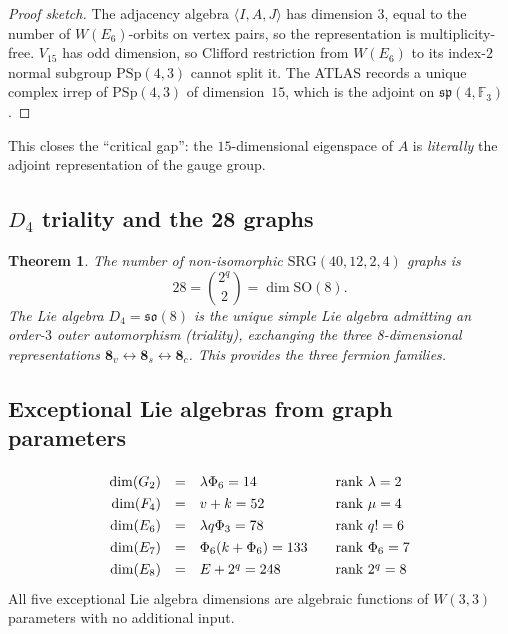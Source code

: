 \documentclass[12pt,a4paper]{article}
\newtheorem{theorem}{Theorem}[section]
\theoremstyle{definition}
\newcommand{\SRG}{\mathrm{SRG}}
\newcommand{\PSp}{\mathrm{PSp}}
\newcommand{\SO}{\mathrm{SO}}
\newcommand{\Phithree}{\Phi_3}
\newcommand{\Phisix}{\Phi_6}
\newcommand{\FF}{\mathbb{F}}
\begin{document}
\begin{proof}[Proof sketch]
The adjacency algebra $\langle I,A,J\rangle$ has dimension $3$, equal to
the number of $W(E_6)$-orbits on vertex pairs, so the representation is
multiplicity-free.  $V_{15}$ has odd dimension, so Clifford restriction
from $W(E_6)$ to its index-$2$ normal subgroup $\PSp(4,3)$ cannot split
it.  The ATLAS records a unique complex irrep of $\PSp(4,3)$ of
dimension~$15$, which is the adjoint on $\mathfrak{sp}(4,\FF_3)$.
\end{proof}

\noindent
This closes the ``critical gap'': the $15$-dimensional eigenspace of $A$
is \emph{literally} the adjoint representation of the gauge group.

\subsection{\texorpdfstring{$D_4$}{D4} triality and the 28 graphs}

\begin{theorem}
The number of non-isomorphic $\SRG(40,12,2,4)$ graphs is
\begin{equation}
  28 = \binom{2^q}{2} = \dim\SO(8).
\end{equation}
The Lie algebra $D_4=\mathfrak{so}(8)$ is the unique simple Lie algebra
admitting an order-$3$ outer automorphism (triality), exchanging the three
8-dimensional representations $\mathbf{8}_v\leftrightarrow\mathbf{8}_s
\leftrightarrow\mathbf{8}_c$.  This provides the three fermion families.
\end{theorem}

\subsection{Exceptional Lie algebras from graph parameters}

\begin{equation}
  \label{eq:exceptional}
  \renewcommand{\arraystretch}{1.3}
  \begin{array}{rclcl}
  \dim(G_2)  &=& \lambda\Phisix = 14   && \text{rank } \lambda = 2 \\
  \dim(F_4)  &=& v+k = 52             && \text{rank } \mu = 4 \\
  \dim(E_6)  &=& \lambda q\Phithree = 78 && \text{rank } q! = 6 \\
  \dim(E_7)  &=& \Phisix(k+\Phisix) = 133 && \text{rank } \Phisix = 7 \\
  \dim(E_8)  &=& E + 2^q = 248        && \text{rank } 2^q = 8
  \end{array}
\end{equation}
All five exceptional Lie algebra dimensions are algebraic functions of
$W(3,3)$ parameters with no additional input.
\end{document}
